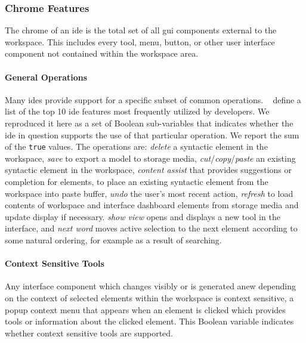 \subsubsection{Chrome Features} \label{subsubsec:chrome}

The chrome of an \ac{ide} is the total set of all \acf{gui} components
external to the workspace. This includes every tool, menu, button, or other
user interface component not contained within the workspace area.


\paragraph{General Operations}
Many \acp{ide} provide support for a specific subset of common operations.
\citeauthor{murphy2006}~\cite{murphy2006} define a list of the top 10 \ac{ide} features most frequently utilized by developers.
We reproduced it here as a set of Boolean sub-variables that indicates whether the \ac{ide} in question supports the use of that particular operation.
We report the sum of the \texttt{true} values.
The operations are: \emph{delete} a syntactic element in the workspace,
\emph{save} to export a model to storage media,
\emph{cut}/\emph{copy}/\emph{paste} an existing syntactic element in the workspace,
\emph{content assist} that provides suggestions or completion for elements,
 to place an existing syntactic element from the workspace into paste buffer,
\emph{undo} the user's most recent action,
\emph{refresh} to load contents of workspace and interface dashboard elements from storage media and update display if necessary.
\emph{show view} opens and displays a new tool in the interface,
and
\emph{next word} moves active selection to the next element according to some natural ordering, for example as a result of searching.


\paragraph{Context Sensitive Tools}
Any interface component which changes visibly or is generated anew
depending on the context of selected elements within the workspace is
context sensitive, \eg a popup context menu that appears when an element is
clicked which provides tools or information about the clicked element.
This Boolean variable indicates whether context sensitive tools are
supported.


